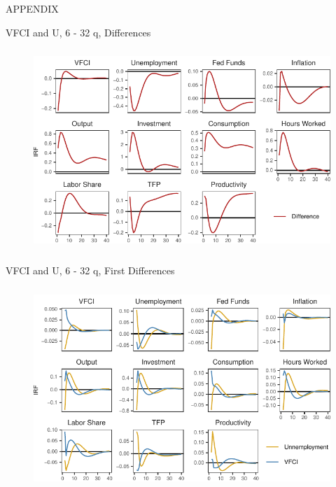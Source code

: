 \begin{frame}
    \frametitle{}
    \centering
    \Huge
    APPENDIX
\end{frame}


\begin{frame}{VFCI and U, 6 - 32 q, Differences}
    
    \label{BCA_MBC_diff}

    \vspace{-0.25cm}

    \begin{figure}
        \includegraphics[height = 3in]{figs/app1_BCA_MBC_diff.pdf}
        \vspace{0.5cm}
    \end{figure}


\end{frame}


\begin{frame}{VFCI and U, 6 - 32 q, First Differences}
    
    \label{BCA_MBC_first_diff}

    \vspace{-0.25cm}
    
    \begin{figure}
        \includegraphics[height = 3in]{figs/app2_BCA_MBC_first_diff.pdf}
    \end{figure}


\end{frame}
